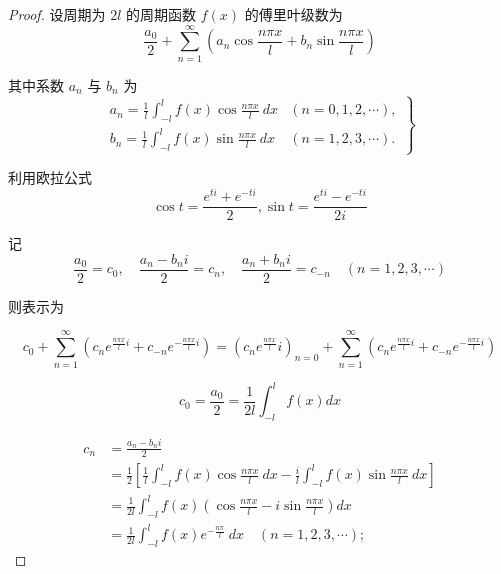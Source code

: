 \begin{proof}
    设周期为 $ 2 l $ 的周期函数 $ f(x) $ 的傅里叶级数为
\begin{equation}
\frac{a_{0}}{2}+\sum_{n=1}^{\infty}\left(a_{n} \cos \frac{n \pi x}{l}+b_{n} \sin \frac{n \pi x}{l}\right)
\end{equation}

其中系数 $ a_{n} $ 与 $ b_{n} $ 为
\begin{equation}
\left.\begin{array}{ll}
a_{n}=\frac{1}{l} \int_{-l}^{l} f(x) \cos \frac{n \pi x}{l} {~d} x & (n=0,1,2, \cdots), \\
b_{n}=\frac{1}{l} \int_{-l}^{l} f(x) \sin \frac{n \pi x}{l} {~d} x & (n=1,2,3, \cdots) .
\end{array}\right\}
\end{equation}

利用欧拉公式
\begin{equation} \cos t=\frac{{e}^{{ti}}+{e}^{-t i}}{2}, \sin t=\frac{{e}^{t {i}}-{e}^{-t {i}}}{2 {i}} \end{equation}

记
\begin{equation}
\frac{a_{0}}{2}=c_{0}, \quad \frac{a_{n}-b_{n} {i}}{2}=c_{n}, \quad \frac{a_{n}+b_{n} {i}}{2}=c_{-n} \quad(n=1,2,3, \cdots)
\end{equation}

则表示为

\begin{equation} c_{0}+\sum_{n=1}^{\infty}\left(c_{n} {e}^{\frac{n \pi x}{l} i}+c_{-n} {e}^{-\frac{n \pi x}{l} i}\right) =\left(c_{n} {e}^{\frac{n \pi x}{l}}i\right)_{n=0}+\sum_{n=1}^{\infty}\left(c_{n} {e}^{\frac{n \pi x}{l}i}+c_{-n} {e}^{-\frac{n \pi x}{l}i}\right) \end{equation}

\begin{equation} c_{0}=\frac{a_{0}}{2}=\frac{1}{2 l} \int_{-l}^{l} f(x) {d} x \end{equation}

\begin{equation}
\begin{aligned}
   c_{n} &=\frac{a_{n}-b_{n} i}{2}  \\
   &=\frac{1}{2}\left[\frac{1}{l} \int_{-l}^{l} f(x) \cos \frac{n \pi x}{l} {~d} x-\frac{{i}}{l} \int_{-l}^{l} f(x) \sin \frac{n \pi x}{l} {~d} x\right] \\
   &=\frac{1}{2 l} \int_{-l}^{l} f(x)\left(\cos \frac{n \pi x}{l}-{i} \sin \frac{n \pi x}{l}\right) {d} x\\
   &=\frac{1}{2 l} \int_{-l}^{l} f(x) {e}^{-\frac{n \pi}{l}} {~d} x \quad(n=1,2,3, \cdots) ;
\end{aligned}
\end{equation}


\end{proof}
